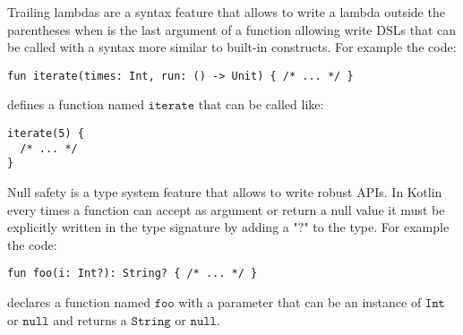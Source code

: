 Trailing lambdas are a syntax feature that allows to write a lambda outside the parentheses when is the last argument of a function allowing write DSLs that can be called with a syntax more similar to built-in constructs. For example the code:
\begin{lstlisting}[language={kotac}]
fun iterate(times: Int, run: () -> Unit) { /* ... */ }
\end{lstlisting}
defines a function named $\mathtt{iterate}$ that can be called like:
\begin{lstlisting}[language={kotac}]
iterate(5) {
  /* ... */
}
\end{lstlisting}

Null safety is a type system feature that allows to write robust APIs. In Kotlin every times a function can accept as argument or return a null value it must be explicitly written in the type signature by adding a "$\mathtt{?}$" to the type. For example the code:
\begin{lstlisting}[language={kotac}]
fun foo(i: Int?): String? { /* ... */ }
\end{lstlisting}
declares a function named $\mathtt{foo}$ with a parameter that can be an instance of $\mathtt{Int}$ or $\mathtt{null}$ and returns a $\mathtt{String}$ or $\mathtt{null}$.
